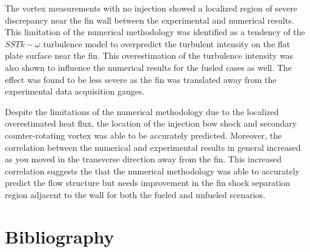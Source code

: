 \documentclass{AIAA}
\begin{document}
The vortex measurements with no injection showed a localized region of severe discrepancy near the fin wall between the experimental and numerical results.
This limitation of the numerical methodology was identified as a tendency of the $SST k-\omega$ turbulence model to overpredict the turbulent intensity on the flat plate surface near the fin.
This overestimation of the turbulence intensity was also shown to influence the numerical results for the fueled cases as well.
The effect was found to be less severe as the fin was translated away from the experimental data acquisition gauges.


Despite the limitations of the numerical methodology due to the localized overestimated heat flux, the location of the injection bow shock and secondary counter-rotating vortex was able to be accurately predicted.
Moreover, the correlation between the numerical and experimental results in general increased as you moved in the transverse direction away from the fin.
This increased correlation suggests the that the numerical methodology was able to accurately predict the flow structure but needs improvement in the fin shock separation region adjacent to the wall for both the fueled and unfueled scenarios.


\section{Bibliography}
\end{document}
